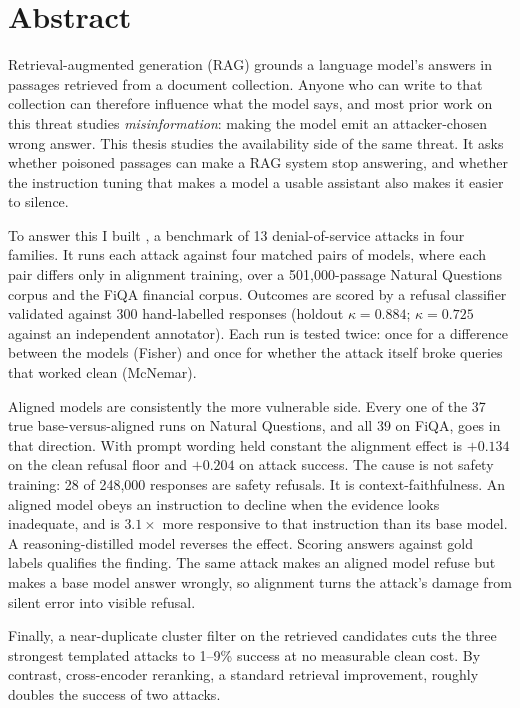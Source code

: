 \chapter*{Abstract}

Retrieval-augmented generation (RAG) grounds a language model's answers in
passages retrieved from a document collection. Anyone who can write to that
collection can therefore influence what the model says, and most prior work on
this threat studies \emph{misinformation}: making the model emit an
attacker-chosen wrong answer. This thesis studies the availability side of the
same threat. It asks whether poisoned passages can make a RAG system stop
answering, and whether the instruction tuning that makes a model a usable
assistant also makes it easier to silence.

To answer this I built \bench{}, a benchmark of 13 denial-of-service attacks
in four families. It runs each attack against four matched pairs of models,
where each pair differs only in alignment training, over a 501{,}000-passage
Natural Questions corpus and the FiQA financial corpus. Outcomes are scored by
a refusal classifier validated against 300 hand-labelled responses (holdout
$\kappa = 0.884$; $\kappa = 0.725$ against an independent annotator). Each run
is tested twice: once for a difference between the models (Fisher) and once for
whether the attack itself broke queries that worked clean (McNemar).

Aligned models are consistently the more vulnerable side. Every one of the 37
true base-versus-aligned runs on Natural Questions, and all 39 on FiQA, goes in
that direction. With prompt wording held constant the alignment effect is
$+0.134$ on the clean refusal floor and $+0.204$ on attack success. The cause is
not safety training: 28 of 248{,}000 responses are safety refusals. It is
context-faithfulness. An aligned model obeys an instruction to decline when the
evidence looks inadequate, and is $3.1\times$ more responsive to that
instruction than its base model. A reasoning-distilled model reverses the
effect. Scoring answers against gold labels qualifies the finding. The same
attack makes an aligned model refuse but makes a base model answer wrongly, so
alignment turns the attack's damage from silent error into visible refusal.

Finally, a near-duplicate cluster filter on the retrieved candidates cuts the
three strongest templated attacks to 1--9\% success at no measurable clean
cost. By contrast, cross-encoder reranking, a standard retrieval improvement,
roughly doubles the success of two attacks.
